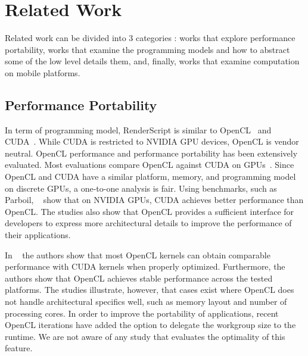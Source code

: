 \section{Related Work}
\label{sec:related}

Related work can be divided into $3$ categories : works that
explore performance portability, works that examine the
programming models and how to abstract some of the low level details them, and,
finally, works that examine computation on mobile platforms.

\subsection{Performance Portability}

In term of programming model, RenderScript is similar to OpenCL~\cite{OpenCL}
and CUDA~\cite{CUDA:Programming-Guide}. While CUDA is restricted to NVIDIA GPU
devices, OpenCL is vendor neutral. OpenCL performance and performance
portability has been extensively evaluated.  Most evaluations compare OpenCL
against CUDA on GPUs~\cite{fang2011comprehensive, weber2011comparing,
van2011correlating, vassilev2010comparison, amorim2009comparing,
karimi2010performance, komatsu2010evaluating}.  Since OpenCL and CUDA have a
similar platform, memory, and programming model on discrete GPUs, a one-to-one
analysis is fair.  Using benchmarks, such as Parboil, ~\cite{weber2011comparing,
van2011correlating, vassilev2010comparison, amorim2009comparing} show that on
NVIDIA GPUs, CUDA achieves better performance than OpenCL.  The studies also
show that OpenCL provides a sufficient interface for developers to express more
architectural details to improve the performance of their applications. 

In ~\cite{komatsu2010evaluating,fang2011comprehensive,dolbeau2013one} the
authors show that most OpenCL kernels can obtain comparable performance with
CUDA kernels when properly optimized.  Furthermore, the authors show that OpenCL
achieves stable performance across the tested platforms. The studies illustrate,
however, that cases exist where OpenCL does not handle architectural specifics
well, such as memory layout and number of processing cores. In order to improve
the portability of applications, recent OpenCL iterations have added the option
to delegate the workgroup size to the runtime.  We are not aware of any study
that evaluates the optimality of this feature.



